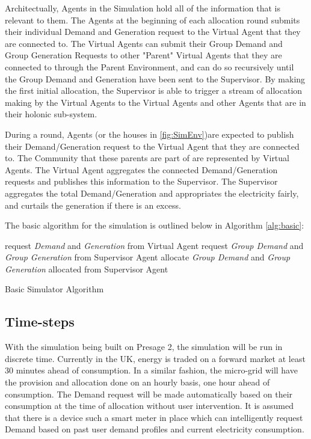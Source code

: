 Architectually, Agents in the Simulation hold all of the information that is relevant to them. The Agents at the beginning of each allocation round submits their individual Demand and Generation request to the Virtual Agent that they are connected to. The Virtual Agents can submit their Group Demand and Group Generation Requests to other "Parent" Virtual Agents that they are connected to through the Parent Environment, and can do so recursively until the Group Demand and Generation have been sent to the Supervisor. By making the first initial allocation, the Supervisor is able to trigger a stream of allocation making by the Virtual Agents to the Virtual Agents and other Agents that are in their holonic sub-system.

\clearpage
During a round, Agents (or the houses in \ref{fig:SimEnv})are expected to publish their Demand/Generation request to the Virtual Agent that they are connected to. The Community that these parents are part of are represented by Virtual Agents. The Virtual Agent aggregates the connected Demand/Generation requests and publishes this information to the Supervisor. The Supervisor aggregates the total Demand/Generation and appropriates the electricity fairly, and curtails the generation if there is an excess.

The basic algorithm for the simulation is outlined below in Algorithm \ref{alg:basic}: \\

\begin{algorithm}[H]
	 {
		request \textit{Demand} and \textit{Generation} from Virtual Agent\;
	}
	 {
		request \textit{Group Demand} and \textit{Group Generation} from Supervisor Agent\;
	}
	 {
		allocate \textit{Group Demand} and \textit{Group Generation} allocated from Supervisor Agent\;
	}
	\caption{Basic Simulator Algorithm}
	\label{alg:basic}
\end{algorithm}

\subsection*{Time-steps}
With the simulation being built on Presage 2, the simulation will be run in discrete time. Currently in the UK, energy is traded on a forward market at least 30 minutes ahead of consumption. In a similar fashion, the micro-grid will have the provision and allocation done on an hourly basis, one hour ahead of consumption. The Demand request will be made automatically based on their consumption at the time of allocation without user intervention. It is assumed that there is a device such a smart meter in place which can intelligently request Demand based on past user demand profiles and current electricity consumption. 


